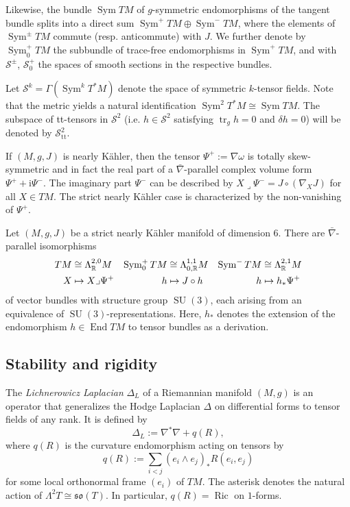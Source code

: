 \documentclass[12pt]{scrartcl}
\theoremstyle{plain}
\theoremstyle{definition}
\newcommand{\R}{\mathbb{R}}%
\newcommand{\Ric}{\operatorname{Ric}}%
\newcommand{\Sym}{\operatorname{Sym}}%
\newcommand{\tr}{\operatorname{tr}}%
\newcommand{\End}{\operatorname{End}}%
\renewcommand{\S}{\mathscr{S}}%
\newcommand{\SU}{\operatorname{SU}}%
\newcommand{\so}{\mathfrak{so}}%
\renewcommand{\i}{\mathrm{i}}%
\newcommand{\TT}{\S^2_{\mathrm{tt}}}%
\begin{document}
Likewise, the bundle $\Sym TM$ of $g$-symmetric endomorphisms of the tangent bundle splits into a direct sum $\Sym^+TM\oplus\Sym^-TM$, where the elements of $\Sym^\pm TM$ commute (resp. anticommute) with $J$. We further denote by $\Sym^+_0TM$ the subbundle of trace-free endomorphisms in $\Sym^+TM$, and with $\S^\pm$, $\S^+_0$ the spaces of smooth sections in the respective bundles.

Let $\S^k=\Gamma(\Sym^kT^\ast M)$ denote the space of symmetric $k$-tensor fields. Note that the metric yields a natural identification $\Sym^2T^\ast M\cong\Sym TM$. The subspace of tt-tensors in $\S^2$ (i.e. $h\in\S^2$ satisfying $\tr_gh=0$ and $\delta h=0$) will be denoted by $\TT$.

If $(M,g,J)$ is nearly Kähler, then the tensor $\Psi^+:=\nabla\omega$ is to\-tal\-ly skew-sym\-met\-ric and in fact the real part of a $\bar\nabla$-parallel complex volume form $\Psi^++\i\Psi^-$. The imaginary part $\Psi^-$ can be described by $X\lrcorner\Psi^-=J\circ(\nabla_XJ)$ for all $X\in TM$. The strict nearly Kähler case is characterized by the non-vanishing of $\Psi^+$.

Let $(M,g,J)$ be a strict nearly Kähler manifold of dimension $6$. There are $\bar\nabla$-parallel isomorphisms
\begin{align}
 TM&\cong\Lambda^{2,0}_\R M&\Sym^+_0TM&\cong\Lambda^{1,1}_{0,\R}M&\Sym^-TM&\cong\Lambda^{2,1}_\R M\label{iso}\\
 X&\mapsto X\lrcorner\Psi^+&h&\mapsto J\circ h&h&\mapsto h_\ast\Psi^+\notag
\end{align}
of vector bundles with structure group $\SU(3)$, each arising from an equivalence of $\SU(3)$-representations. Here, $h_\ast$ denotes the extension of the endomorphism $h\in\End TM$ to tensor bundles as a derivation.

\subsection{Stability and rigidity}
\label{sec:prelimst}

The \emph{Lichnerowicz Laplacian} $\Delta_L$ of a Riemannian manifold $(M,g)$ is an operator that generalizes the Hodge Laplacian $\Delta$ on differential forms to tensor fields of any rank. It is defined by
\[\Delta_L:=\nabla^\ast\nabla+q(R),\]
where $q(R)$ is the curvature endomorphism acting on tensors by
\[q(R):=\sum_{i<j}(e_i\wedge e_j)_\ast R(e_i,e_j)\]
for some local orthonormal frame $(e_i)$ of $TM$. The asterisk denotes the natural action of $\Lambda^2T\cong\so(T)$. In particular, $q(R)=\Ric$ on $1$-forms.
\end{document}
